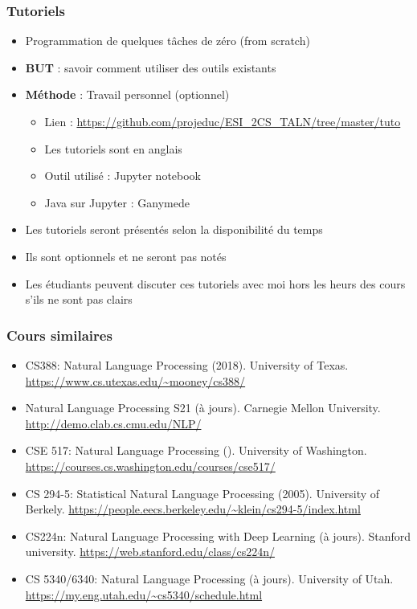\documentclass{beamer}
\begin{document}
\begin{frame}
	\frametitle{Tutoriels}
	
	\begin{itemize}
		\item Programmation de quelques tâches de zéro (from scratch)
		\item \textbf{BUT} : savoir comment utiliser des outils existants 
		\item \textbf{Méthode} : Travail personnel (optionnel)
		\begin{itemize}
			\item Lien : {\scriptsize\url{https://github.com/projeduc/ESI_2CS_TALN/tree/master/tuto}}
			\item Les tutoriels sont en anglais
			\item Outil utilisé : Jupyter notebook
			\item Java sur Jupyter : Ganymede
		\end{itemize}
		\item Les tutoriels seront présentés selon la disponibilité du temps
		\item Ils sont optionnels et ne seront pas notés
		\item Les étudiants peuvent discuter ces tutoriels avec moi hors les heurs des cours s'ils ne sont pas clairs
	\end{itemize}
	
\end{frame}

\begin{frame}
	\frametitle{Cours similaires}
	
	\begin{itemize}
		\item CS388: Natural Language Processing (2018). 
		University of Texas. 
		\url{https://www.cs.utexas.edu/~mooney/cs388/}
		
		\item Natural Language Processing S21 (à jours).
		Carnegie Mellon University. 
		\url{http://demo.clab.cs.cmu.edu/NLP/}
		
		\item CSE 517: Natural Language Processing ().
		University of Washington.
		\url{https://courses.cs.washington.edu/courses/cse517/}
		
		\item CS 294-5: Statistical Natural Language Processing (2005). 
		University of Berkely. 
		\url{https://people.eecs.berkeley.edu/~klein/cs294-5/index.html}
		
		\item CS224n: Natural Language Processing with Deep Learning (à jours).
		Stanford university.
		\url{https://web.stanford.edu/class/cs224n/}
		
		\item CS 5340/6340: Natural Language Processing (à jours). 
		University of Utah.
		\url{https://my.eng.utah.edu/~cs5340/schedule.html}
		
	\end{itemize}
	
\end{frame}
\end{document}
